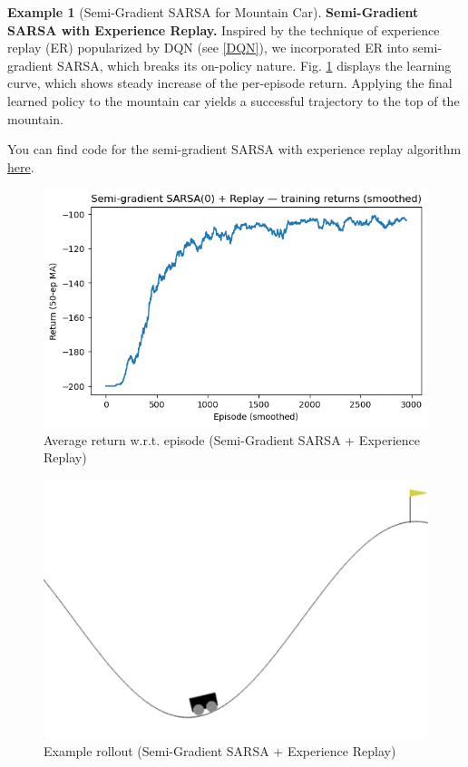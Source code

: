 \documentclass[
]{book}
\theoremstyle{definition}
\theoremstyle{definition}
\newtheorem{example}{Example}[chapter]
\theoremstyle{definition}
\theoremstyle{definition}
\theoremstyle{remark}
\begin{document}
\begin{example}[Semi-Gradient SARSA for Mountain Car]
\textbf{Semi-Gradient SARSA with Experience Replay.} Inspired by the technique of experience replay (ER) popularized by DQN (see \ref{DQN}), we incorporated ER into semi-gradient SARSA, which breaks its on-policy nature. Fig. \ref{fig:Mountain-car-sarsa-er-episode-return} displays the learning curve, which shows steady increase of the per-episode return. Applying the final learned policy to the mountain car yields a successful trajectory to the top of the mountain.

You can find code for the semi-gradient SARSA with experience replay algorithm \href{https://github.com/ComputationalRobotics/2025-ES-AM-158-LECTURE-CODE/blob/main/mountaincar_sarsa_er.py}{here}.

\begin{figure}

{\centering \includegraphics[width=0.6\linewidth]{images/Value-RL/mountain-car_sarsa+er_eps3000_seed50_returns} 

}

\caption{Average return w.r.t. episode (Semi-Gradient SARSA + Experience Replay)}\label{fig:Mountain-car-sarsa-er-episode-return}
\end{figure}

\begin{figure}

{\centering \includegraphics[width=0.6\linewidth]{images/Value-RL/mountain-car_sarsa+er_eps3000_seed50_greedy-episode-0} 

}

\caption{Example rollout (Semi-Gradient SARSA + Experience Replay)}\label{fig:Mountain-car-sarsa-er-rollout}
\end{figure}

\end{example}
\end{document}
